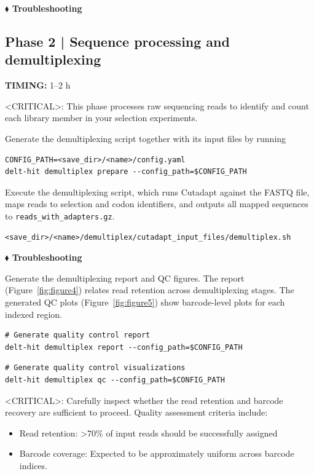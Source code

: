 \textbf{$\blacklozenge$ Troubleshooting}

\subsection{Phase 2 | Sequence processing and demultiplexing}

\textbf{TIMING:} 1--2 h

<CRITICAL>: This phase processes raw sequencing reads to identify and count each library member in your selection experiments. 

Generate the demultiplexing script together with its input files by running

\begin{lstlisting}
CONFIG_PATH=<save_dir>/<name>/config.yaml
delt-hit demultiplex prepare --config_path=$CONFIG_PATH
\end{lstlisting}

Execute the demultiplexing script, which runs Cutadapt against the FASTQ file, maps reads to selection and codon identifiers, and outputs all mapped sequences to \texttt{reads\_with\_adapters.gz}.

\begin{lstlisting}
<save_dir>/<name>/demultiplex/cutadapt_input_files/demultiplex.sh
\end{lstlisting}

\textbf{$\blacklozenge$ Troubleshooting}

Generate the demultiplexing report and QC figures. The report (Figure~\ref{fig:figure4}) relates read retention across demultiplexing stages. The generated QC plots (Figure~\ref{fig:figure5}) show barcode-level plots for each indexed region.

\begin{lstlisting}
# Generate quality control report
delt-hit demultiplex report --config_path=$CONFIG_PATH
\end{lstlisting}

\begin{lstlisting}
# Generate quality control visualizations
delt-hit demultiplex qc --config_path=$CONFIG_PATH
\end{lstlisting}

<CRITICAL>: Carefully inspect whether the read retention and barcode recovery are sufficient to proceed. Quality assessment criteria include:

\begin{itemize}
  \item Read retention: \textgreater{}70\% of input reads should be successfully assigned
  \item Barcode coverage: Expected to be approximately uniform across barcode indices.
\end{itemize}

